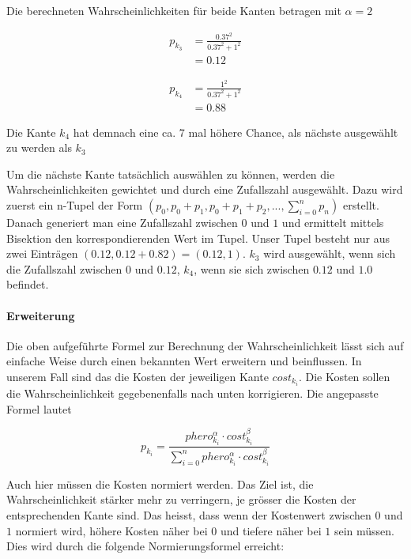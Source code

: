 Die berechneten Wahrscheinlichkeiten für beide Kanten betragen mit $\alpha = 2$

\begin{equation*}
\begin{split}
p_{k_3} & = \frac{0.37^2}{0.37^2 + 1^2} \\
        & = 0.12
\end{split}
\end{equation*}

\begin{equation*}
\begin{split}
p_{k_4} & = \frac{1^2}{0.37^2 + 1^2} \\
        & = 0.88
\end{split}
\end{equation*}

Die Kante $k_4$ hat demnach eine ca. 7 mal höhere Chance, als nächste ausgewählt zu werden als $k_3$

Um die nächste Kante tatsächlich auswählen zu können, werden die Wahrscheinlichkeiten gewichtet und durch eine Zufallszahl ausgewählt. Dazu wird zuerst ein n-Tupel der Form $(p_0, p_0 + p_1, p_0 + p_1 + p_2, ..., \sum\nolimits_{i=0}^n p_n)$ erstellt. Danach generiert man eine Zufallszahl zwischen $0$ und $1$ und ermittelt mittels Bisektion den korrespondierenden Wert im Tupel. Unser Tupel besteht nur aus zwei Einträgen $(0.12, 0.12 + 0.82) = (0.12, 1)$. $k_3$ wird ausgewählt, wenn sich die Zufallszahl zwischen $0$ und $0.12$, $k_4$, wenn sie sich zwischen $0.12$ und $1.0$ befindet. 

\paragraph*{Erweiterung}

Die oben aufgeführte Formel zur Berechnung der Wahrscheinlichkeit lässt sich auf einfache Weise durch einen bekannten Wert erweitern und beinflussen. In unserem Fall sind das die Kosten der jeweiligen Kante $cost_{k_i}$. Die Kosten sollen die Wahrscheinlichkeit gegebenenfalls nach unten korrigieren. Die angepasste Formel lautet

\[ p_{k_i} = \frac{phero_{k_i}^\alpha \cdot cost_{k_i}^\beta}{\sum\nolimits_{i=0}^n phero_{k_i}^\alpha \cdot cost_{k_i}^\beta} \] 

Auch hier müssen die Kosten normiert werden. Das Ziel ist, die Wahrscheinlichkeit stärker mehr zu verringern, je grösser die Kosten der entsprechenden Kante sind. Das heisst, dass wenn der Kostenwert zwischen $0$ und $1$ normiert wird, höhere Kosten näher bei $0$ und tiefere näher bei $1$ sein müssen. Dies wird durch die folgende Normierungsformel erreicht:

